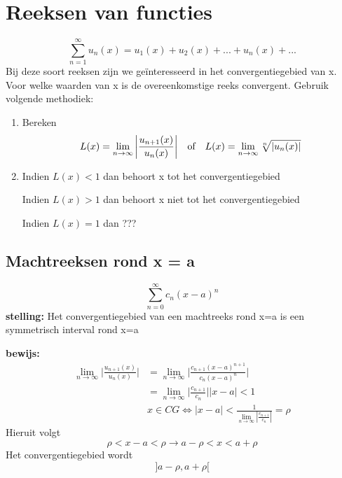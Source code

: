 \section{Reeksen van functies}
$$\sum_{n = 1}^{\infty} u_n(x) = u_1(x) + u_2(x) + ... + u_n(x) + ...$$
Bij deze soort reeksen zijn we geïnteresseerd in het convergentiegebied van x. Voor welke waarden van x is de overeenkomstige reeks convergent.
Gebruik volgende methodiek:
\begin{enumerate}
    \item Bereken
        $$L(x) = \lim\limits_{n\to\infty} \bigg| \frac{u_{n + 1}(x)}{u_n(x)} \bigg| \quad\hbox{of}\quad L(x) = \lim\limits_{n\to\infty} \sqrt[n]{|u_n(x)|}$$
    \item Indien $L(x) < 1$ dan behoort x tot het convergentiegebied

          Indien $L(x) > 1$ dan behoort x niet tot het convergentiegebied

          Indien $L(x) = 1$ dan ???

\end{enumerate}

\subsection{Machtreeksen rond x = a}
$$\sum_{n = 0}^{\infty} c_n(x - a)^n$$
\textbf{stelling:} Het convergentiegebied van een machtreeks rond x=a is een symmetrisch interval rond x=a

\textbf{bewijs:}
\begin{equation*}
    \begin{split}
        \lim\limits_{n\to\infty} \bigg|\frac{ u_{n + 1}(x)}{u_n(x)} \bigg| & = \lim\limits_{n\to\infty} \bigg|\frac{ c_{n + 1}(x - a)^{n + 1}}{c_n(x - a)^n} \bigg| \\
        & = \lim\limits_{n\to\infty} \bigg | \frac{c_{n + 1}}{c_n} \bigg | |x - a| < 1 \\
        & x \in CG \Leftrightarrow |x - a| < \frac{1}{ \lim\limits_{n\to\infty} | \frac{c_{n + 1}}{c_n}|}  = \rho
    \end{split}
\end{equation*}
Hieruit volgt $$\rho < x - a < \rho \rightarrow a - \rho < x < a + \rho$$
Het convergentiegebied wordt $$]a - \rho, a + \rho[$$

